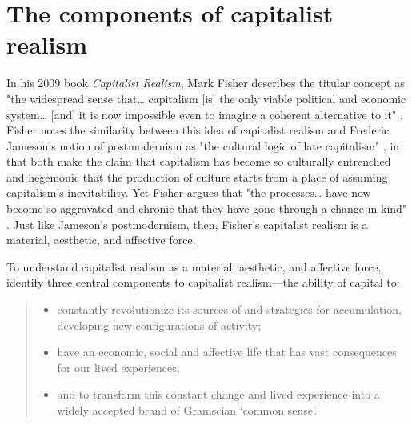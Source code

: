 \section{The components of capitalist realism}
\label{sec:2-components}

In his 2009 book \emph{Capitalist Realism}, Mark Fisher describes the titular concept as "the widespread sense that\ldots{} capitalism [is] the only viable political and economic system\ldots{} [and] it is now impossible even to imagine a coherent alternative to it" \citep[p. 2]{fisher_capitalist_2009}. Fisher notes the similarity between this idea of capitalist realism and Frederic Jameson's notion of postmodernism as "the cultural logic of late capitalism"  \citeyearpar[p. 54]{jameson_postmodernism_1991}, in that both make the claim that capitalism has become so culturally entrenched and hegemonic that the production of culture starts from a place of assuming capitalism's inevitability. Yet Fisher argues that "the processes\ldots{} have now become so aggravated and chronic that they have gone through a change in kind" \cite[p. 7]{fisher_capitalist_2009}. Just like Jameson's postmodernism, then, Fisher's capitalist realism is a material, aesthetic, and affective force. 

To understand capitalist realism as a material, aesthetic, and affective force, \citet[p. 6]{shonkwiler_reading_2014} identify three central components to capitalist realism—the ability of capital to:
\begin{quote}
\begin{itemize}
\item  constantly revolutionize its sources of and strategies for accumulation, developing new configurations of activity;
\item   have an economic, social and affective life that has vast consequences for our lived experiences;
\item  and to transform this constant change and lived experience into a widely accepted brand of Gramscian `common sense'.
\end{itemize}
\end{quote}

